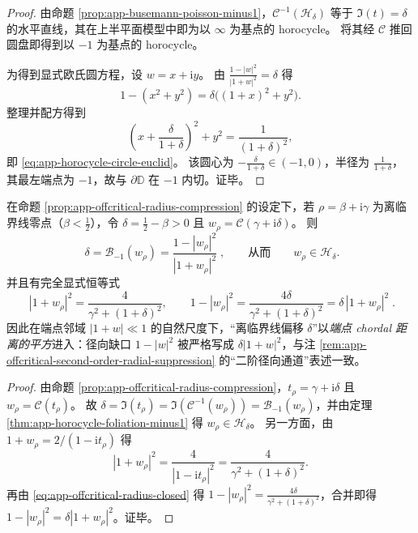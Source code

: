 \begin{proof}
由命题 \ref{prop:app-busemann-poisson-minus1}，\(\mathcal{C}^{-1}(\mathcal{H}_{\delta})\) 等于 \(\Im(t)=\delta\) 的水平直线，其在上半平面模型中即为以 \(\infty\) 为基点的 horocycle。
将其经 \(\mathcal{C}\) 推回圆盘即得到以 \(-1\) 为基点的 horocycle。
\par
为得到显式欧氏圆方程，设 \(w=x+\mathrm{i}y\)。
由 \(\frac{1-|w|^{2}}{|1+w|^{2}}=\delta\) 得
\[
1-(x^{2}+y^{2})=\delta\bigl((1+x)^{2}+y^{2}\bigr).
\]
整理并配方得到
\[
\left(x+\frac{\delta}{1+\delta}\right)^{2}+y^{2}=\frac{1}{(1+\delta)^{2}},
\]
即 \eqref{eq:app-horocycle-circle-euclid}。
该圆心为 \(-\frac{\delta}{1+\delta}\in(-1,0)\)，半径为 \(\frac{1}{1+\delta}\)，其最左端点为 \(-1\)，故与 \(\partial\mathbb{D}\) 在 \(-1\) 内切。证毕。
\end{proof}

\begin{corollary}\label{cor:app-offcritical-horocycle-busemann}
在命题 \ref{prop:app-offcritical-radius-compression} 的设定下，若 \(\rho=\beta+\mathrm{i}\gamma\) 为离临界线零点（\(\beta<\tfrac12\)），令 \(\delta=\tfrac12-\beta>0\) 且 \(w_{\rho}=\mathcal{C}(\gamma+\mathrm{i}\delta)\)。
则
\[
\boxed{\;\delta=\mathcal{B}_{-1}(w_{\rho})=\frac{1-|w_{\rho}|^{2}}{|1+w_{\rho}|^{2}}\;},
\qquad\text{从而}\qquad
w_{\rho}\in\mathcal{H}_{\delta}.
\]
并且有完全显式恒等式
\[
\boxed{\;
|1+w_{\rho}|^{2}=\frac{4}{\gamma^{2}+(1+\delta)^{2}},
\qquad
1-|w_{\rho}|^{2}=\frac{4\delta}{\gamma^{2}+(1+\delta)^{2}}
=\delta\,|1+w_{\rho}|^{2}\; }.
\]
因此在端点邻域 \(|1+w|\ll 1\) 的自然尺度下，“离临界线偏移 \(\delta\)”以\emph{端点 chordal 距离的平方}进入：径向缺口 \(1-|w|^{2}\) 被严格写成 \(\delta|1+w|^{2}\)，与注 \ref{rem:app-offcritical-second-order-radial-suppression} 的“二阶径向通道”表述一致。
\end{corollary}

\begin{proof}
由命题 \ref{prop:app-offcritical-radius-compression}，\(t_{\rho}=\gamma+\mathrm{i}\delta\) 且 \(w_{\rho}=\mathcal{C}(t_{\rho})\)。
故 \(\delta=\Im(t_{\rho})=\Im(\mathcal{C}^{-1}(w_{\rho}))=\mathcal{B}_{-1}(w_{\rho})\)，并由定理 \ref{thm:app-horocycle-foliation-minus1} 得 \(w_{\rho}\in\mathcal{H}_{\delta}\)。
另一方面，由 \(1+w_{\rho}=2/(1-\mathrm{i}t_{\rho})\) 得
\[
|1+w_{\rho}|^{2}=\frac{4}{|1-\mathrm{i}t_{\rho}|^{2}}
=\frac{4}{\gamma^{2}+(1+\delta)^{2}}.
\]
再由 \eqref{eq:app-offcritical-radius-closed} 得
\(
1-|w_{\rho}|^{2}=\frac{4\delta}{\gamma^{2}+(1+\delta)^{2}}
\)，合并即得 \(1-|w_{\rho}|^{2}=\delta|1+w_{\rho}|^{2}\)。证毕。
\end{proof}

